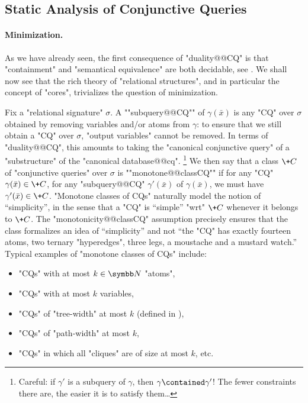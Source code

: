 \subsection{Static Analysis of Conjunctive Queries}
\label{sec:prelim-db-static-analysis-cq}

\paragraph*{Minimization.}
As we have already seen, the first consequence of "duality@@CQ" is that
"containment" and "semantical equivalence" are both
decidable, see .
We shall now see that the rich theory of "relational structures",
and in particular the concept of "cores", trivializes the question of minimization.

Fix a "relational signature" $\sigma$.
A ""subquery@@CQ"" of $\gamma(\bar x)$ is any "CQ" over $\sigma$
obtained by removing variables and/or atoms from $\gamma$:
to ensure that we still obtain a "CQ" over $\sigma$, "output variables" 
cannot be removed.
In terms of "duality@@CQ", this amounts to taking the "canonical conjunctive query" of
a "substructure" of the "canonical database@@cq".%
\footnote{Careful: if $\gamma'$ is a subquery of $\gamma$, then $\gamma \contained \gamma'$!
The fewer constraints there are, the easier it is to satisfy them…}
We then say that a class $\+C$ of "conjunctive queries" over $\sigma$ is ""monotone@@classCQ""
if for any "CQ" $\gamma(\bar x) \in \+C$, for any "subquery@@CQ" $\gamma'(\bar x)$ of
$\gamma(\bar x)$, we must have $\gamma'(\bar x) \in \+C$.
"Monotone classes of CQs" naturally model the notion of ``simplicity'', in the sense that
a "CQ" is ``simple'' "wrt" $\+C$ whenever it belongs to $\+C$. The "monotonicity@@classCQ"
assumption precisely ensures that the class formalizes an idea of ``simplicity''
and not ``the "CQ" has exactly fourteen atoms, two ternary "hyperedges", three legs,
a moustache and a mustard watch.''
Typical examples of "monotone classes of CQs" include:
\begin{itemize}
	\item "CQs" with at most $k \in \N$ "atoms",
	\item "CQs" with at most $k$ variables,
	\item "CQs" of "tree-width" at most $k$ (defined in ),
	\item "CQs" of "path-width" at most $k$,
	\item "CQs" in which all "cliques" are of size at most $k$, etc.
\end{itemize}

